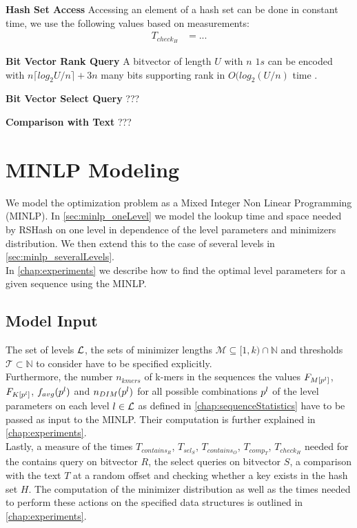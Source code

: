 \documentclass[a4paper,titlepage,onecolumn,oneside,12pt,nenglish,titlepage=firstiscover]{scrbook}
\theoremstyle{plain} %
\theoremstyle{definition} %
\theoremstyle{remark} %
\theoremstyle{plain}
\newcommand{\NN}{\mathbb{N}} %
\newcommand{\level}{l}
\newcommand{\contains}{contains}
\newcommand{\select}{sel}
\newcommand{\compare}{comp}
\newcommand{\timeForOperationOnStructure}[2]{T_{#1_{#2}}} %
\newcommand{\averageFrequency}{f_{avg}}
\newcommand{\possibleMinimizerLengths}{\mathcal{M}}
\newcommand{\possibleThresholds}{\mathcal{T}}
\begin{document}
\textbf{Hash Set Access}
Accessing an element of a hash set can be done in constant time, we use the following values based on measurements:
\begin{align*}
	\timeForOperationOnStructure{check}{H} &= ...
\end{align*}

\textbf{Bit Vector Rank Query}
A bitvector of length $U$ with $n$ $1s$ can be encoded with $n\lceil log_2 U/n \rceil + 3n$ many bits supporting rank in $O(log_2(U/n)$ time \cite{okanohara2007practical}.

\textbf{Bit Vector Select Query}
???

\textbf{Comparison with Text}
???


\chapter{MINLP Modeling}\label{chap:minlp}
We model the optimization problem as a Mixed Integer Non Linear Programming (MINLP). In \cref{sec:minlp_oneLevel} we model the lookup time and space needed by RSHash on one level in dependence of the level parameters and minimizers distribution. We then extend this to the case of several levels in \cref{sec:minlp_severalLevels}.\\
In \cref{chap:experiments} we describe how to find the optimal level parameters for a given sequence using the MINLP.

\section{Model Input}\label{sec:minlp_modelInput}
\newcommand{\nkmers}{n_{kmers}}
The set of levels $\mathcal{L}$, the sets of minimizer lengths $\possibleMinimizerLengths \subseteq [1,k) \cap \NN$ and thresholds $\possibleThresholds \subset \NN$ to consider have to be specified explicitly.
\\
Furthermore, the number $\nkmers$ of k-mers in the sequences the values $\CDF{\compactZV{M}{\levelParameters{\level}}}$, $\CDF{\compactZV{K}{\levelParameters{\level}}}$,  $\averageFrequency(\levelParameters{\level})$ and $\numberOfDistinctMinimizers{\levelParameters{\level}}$ for all possible combinations $\levelParameters{\level}$ of the level parameters on each level $\level \in \setOfLevels$ as defined in \cref{chap:sequenceStatistics} have to be passed as input to the MINLP. Their computation is further explained in \cref{chap:experiments}. 
\\
Lastly, a measure of the times 
$\timeForOperationOnStructure{\contains}{R}$,
$\timeForOperationOnStructure{\select}{S}$,
$\timeForOperationOnStructure{\contains}{O}$,
$\timeForOperationOnStructure{\compare}{T}$,
$\timeForOperationOnStructure{check}{H}$
needed for the contains query on bitvector $R$, the select queries on bitvector $S$, a comparison with the text $T$ at a random offset and checking whether a key exists in the hash set $H$. The computation of the minimizer distribution as well as the times needed to perform these actions on the specified data structures is outlined in \cref{chap:experiments}.
\end{document}
